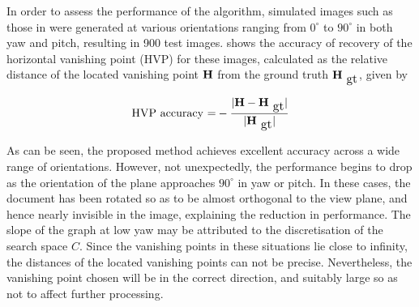 

In order to assess the performance of the algorithm, simulated images such as
those in  were generated at various orientations ranging from
$0^\circ$ to $90^\circ$ in both yaw and pitch, resulting in 900 test images. 
 shows the accuracy of recovery of the horizontal vanishing
point (HVP) for these images, 
calculated as the relative distance of the located vanishing point ${ \bf H }$ 
from the ground truth $\myvec{H}_{\mbox{\small gt}}$, given by

\begin{equation} 
\mbox{HVP accuracy =} -\frac{|\myvec{H}-\myvec{H}_{\mbox{\small gt}}|}{|\myvec{H}_{\mbox{\small gt}}|}
\end{equation}

As can be seen, the proposed method achieves excellent accuracy across a wide
range of orientations. However, not unexpectedly, the performance begins to
drop as the orientation of the plane approaches $90^\circ$ in yaw or pitch. In
these cases, the document has been rotated so as to be almost orthogonal to the
view plane, and hence nearly invisible in the image, explaining the reduction
in performance. The slope of the graph at low yaw may be attributed to the
discretisation of the search space $C$. Since the vanishing points in these
situations lie close to infinity, the distances of the located vanishing points
can not be precise. Nevertheless, the vanishing point chosen will be in the
correct direction, and suitably large so as not to affect further processing.

